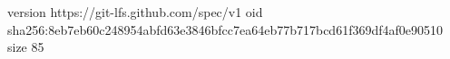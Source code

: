 version https://git-lfs.github.com/spec/v1
oid sha256:8eb7eb60c248954abfd63e3846bfcc7ea64eb77b717bcd61f369df4af0e90510
size 85
